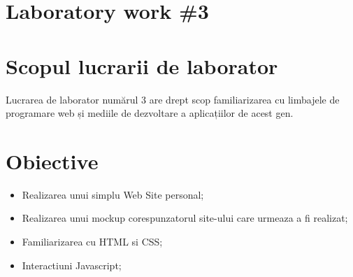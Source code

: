 \section*{Laboratory work \#3}

\section{Scopul lucrarii de laborator}
Lucrarea de laborator numărul 3 are drept scop familiarizarea cu limbajele de programare web și mediile de dezvoltare a aplicațiilor de acest gen.
\section{Obiective}
\textbf{}
\begin{itemize}
\item Realizarea unui simplu Web Site personal;
\item Realizarea unui mockup corespunzatorul site-ului care urmeaza a fi realizat;
\item Familiarizarea cu HTML si CSS;
\item Interactiuni Javascript;
\end{itemize}



\clearpage